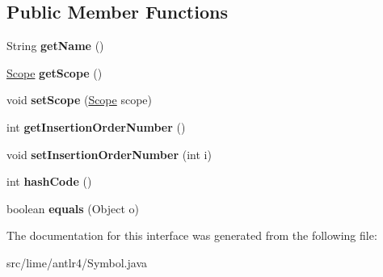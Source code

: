 \subsection*{Public Member Functions}
\begin{DoxyCompactItemize}
\item 
\mbox{\label{interfacelime_1_1antlr4_1_1Symbol_a505dfda70e62ed930ddc16eba30014ca}} 
String {\bfseries get\+Name} ()
\item 
\mbox{\label{interfacelime_1_1antlr4_1_1Symbol_a0628643d2a4ad033592e6f92f1941db8}} 
\hyperlink{interfacelime_1_1antlr4_1_1Scope}{Scope} {\bfseries get\+Scope} ()
\item 
\mbox{\label{interfacelime_1_1antlr4_1_1Symbol_ab3cf8527aee569afe5b6ae0d82d50571}} 
void {\bfseries set\+Scope} (\hyperlink{interfacelime_1_1antlr4_1_1Scope}{Scope} scope)
\item 
\mbox{\label{interfacelime_1_1antlr4_1_1Symbol_a6b92e91502cec05cc20a3c5e24a65149}} 
int {\bfseries get\+Insertion\+Order\+Number} ()
\item 
\mbox{\label{interfacelime_1_1antlr4_1_1Symbol_a3ce1633e8c869671a7e835709717cb74}} 
void {\bfseries set\+Insertion\+Order\+Number} (int i)
\item 
\mbox{\label{interfacelime_1_1antlr4_1_1Symbol_a1530de334023c9d0138eae63fb4928df}} 
int {\bfseries hash\+Code} ()
\item 
\mbox{\label{interfacelime_1_1antlr4_1_1Symbol_a830fa4adfbb899a00613ba8e29588278}} 
boolean {\bfseries equals} (Object o)
\end{DoxyCompactItemize}


The documentation for this interface was generated from the following file\+:\begin{DoxyCompactItemize}
\item 
src/lime/antlr4/Symbol.\+java\end{DoxyCompactItemize}
